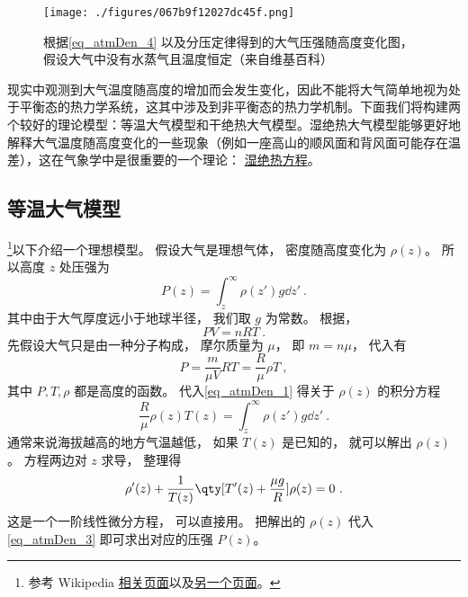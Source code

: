 

\begin{figure}[ht]
\centering
\texttt{[image: ./figures/067b9f12027dc45f.png]}
\caption{根据\autoref{eq_atmDen_4}  以及分压定律得到的大气压强随高度变化图， 假设大气中没有水蒸气且温度恒定（来自维基百科）}\label{fig_atmDen_1}
\end{figure}
现实中观测到大气温度随高度的增加而会发生变化，因此不能将大气简单地视为处于平衡态的热力学系统，这其中涉及到非平衡态的热力学机制。下面我们将构建两个较好的理论模型：等温大气模型和干绝热大气模型。湿绝热大气模型能够更好地解释大气温度随高度变化的一些现象（例如一座高山的顺风面和背风面可能存在温差），这在气象学中是很重要的一个理论：
\href{https://t-inp.readthedocs.io/zh_CN/latest/\%E7\%83\%AD\%E5\%8A\%9B\%E5\%AD\%A6\%E5\%9F\%BA\%E7\%A1\%80.html}{湿绝热方程}。

\subsection{等温大气模型}
\footnote{参考 Wikipedia \href{https://en.wikipedia.org/wiki/Atmospheric_pressure}{相关页面}以及\href{https://en.wikipedia.org/wiki/International_Standard_Atmosphere}{另一个页面}。}以下介绍一个理想模型。 假设大气是理想气体， 密度随高度变化为 $\rho(z)$。 所以高度 $z$ 处压强为
\begin{equation}\label{eq_atmDen_1}
P(z) = \int_{z}^\infty \rho(z') g \dd{z'}~.
\end{equation}
其中由于大气厚度远小于地球半径， 我们取 $g$ 为常数。 根据，
\begin{equation}
PV = n R T~.
\end{equation}
先假设大气只是由一种分子构成， 摩尔质量为 $\mu$， 即 $m = n\mu$， 代入有
\begin{equation}\label{eq_atmDen_3}
P = \frac{m}{\mu V} RT = \frac{R}{\mu} \rho T~,
\end{equation}
其中 $P, T, \rho$ 都是高度的函数。 代入\autoref{eq_atmDen_1} 得关于 $\rho(z)$ 的积分方程
\begin{equation}
\frac{R}{\mu} \rho(z) T(z) = \int_{z}^\infty \rho(z') g \dd{z'}~.
\end{equation}
通常来说海拔越高的地方气温越低， 如果 $T(z)$ 是已知的， 就可以解出 $\rho(z)$。 方程两边对 $z$ 求导， 整理得
\begin{equation}\label{eq_atmDen_5}
\rho'(z)  +  \frac{1}{T(z)}\qty[T'(z) + \frac{\mu g}{R}]\rho(z) = 0~.
\end{equation}
这是一个一阶线性微分方程， 可以直接用。 把解出的 $\rho(z)$ 代入\autoref{eq_atmDen_3} 即可求出对应的压强 $P(z)$。

